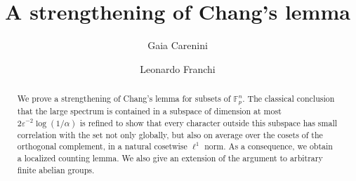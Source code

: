 \documentclass[11pt,reqno]{amsart}
\theoremstyle{plain}
\theoremstyle{remark}
\begin{document}

\title[A strengthening of Chang's lemma]{A strengthening of Chang's lemma}

 
\author[G. Carenini]{Gaia Carenini}
\address{Trinity College Cambridge, Department of Pure Mathematics and Mathematical Statistics, Centre for Mathematical Sciences, Wilberforce Road, Cambridge CB3 0WA, United Kingdom.}

\author[L. Franchi]{Leonardo Franchi}
\address{Department of Pure Mathematics and Mathematical Statistics, Centre for Mathematical Sciences, Wilberforce Road, Cambridge CB3 0WA, United Kingdom}


\begin{abstract}
We prove a strengthening of Chang's lemma for subsets of $\mathbb F_p^n$. The
classical conclusion that the large spectrum is contained in a subspace of
dimension at most $2\varepsilon^{-2}\log(1/\alpha)$ is refined to show that
every character outside this subspace has small correlation with the set not
only globally, but also on average over the cosets of the orthogonal complement,
in a natural cosetwise $\ell^1$ norm. As a consequence, we obtain a localized
counting lemma. We also give an extension of the argument to
arbitrary finite abelian groups.
\end{abstract}
\maketitle
\vspace{-0.8cm}
\tableofcontents
\end{document}
